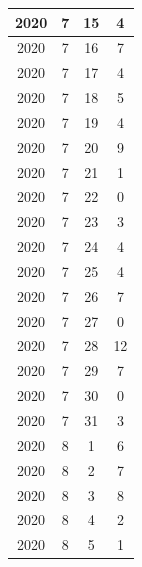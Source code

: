\begin{longtable} {|c|c|c|c|}
\hline
2020         & 7            & 15           & 4                         \\ 
\hline
2020         & 7            & 16           & 7                         \\ 
\hline
2020         & 7            & 17           & 4                         \\ 
\hline
2020         & 7            & 18           & 5                         \\ 
\hline
2020         & 7            & 19           & 4                         \\ 
\hline
2020         & 7            & 20           & 9                         \\ 
\hline
2020         & 7            & 21           & 1                         \\ 
\hline
2020         & 7            & 22           & 0                         \\ 
\hline
2020         & 7            & 23           & 3                         \\ 
\hline
2020         & 7            & 24           & 4                         \\ 
\hline
2020         & 7            & 25           & 4                         \\ 
\hline
2020         & 7            & 26           & 7                         \\ 
\hline
2020         & 7            & 27           & 0                         \\ 
\hline
2020         & 7            & 28           & 12                        \\ 
\hline
2020         & 7            & 29           & 7                         \\ 
\hline
2020         & 7            & 30           & 0                         \\ 
\hline
2020         & 7            & 31           & 3                         \\ 
\hline
2020         & 8            & 1            & 6                         \\ 
\hline
2020         & 8            & 2            & 7                         \\ 
\hline
2020         & 8            & 3            & 8                         \\ 
\hline
2020         & 8            & 4            & 2                         \\ 
\hline
2020         & 8            & 5            & 1                         \\ 

\end{longtable}
